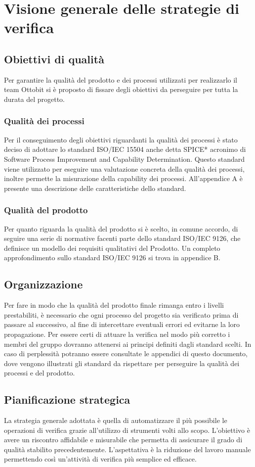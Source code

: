\section{Visione generale delle strategie di verifica}
\subsection{Obiettivi di qualità}
	Per garantire la qualità del prodotto e dei processi utilizzati per realizzarlo il team Ottobit si è proposto di fissare degli obiettivi da perseguire per tutta la durata del progetto.
	\subsubsection{Qualità dei processi}
	Per il conseguimento degli obiettivi riguardanti la qualità dei processi è stato deciso di adottare lo standard ISO/IEC 15504 anche detta SPICE* acronimo di Software Process Improvement and Capability Determination. Questo standard viene utilizzato per eseguire una valutazione concreta della qualità dei processi, inoltre permette la misurazione della capability dei processi. All'appendice A è presente una descrizione delle caratteristiche dello standard.
	\subsubsection{Qualità del prodotto}
		Per quanto riguarda la qualità del prodotto si è scelto, in comune accordo, di seguire una serie di normative facenti parte dello standard ISO/IEC 9126, che definisce un modello dei requisiti qualitativi del Prodotto. Un completo approfondimento sullo standard ISO/IEC 9126 si trova in appendice B.
\subsection{Organizzazione}
Per fare in modo che la qualità del prodotto finale rimanga entro i livelli prestabiliti, è necessario che ogni processo del progetto sia verificato prima di passare al successivo, al fine di intercettare eventuali errori ed evitarne la loro propagazione. Per essere certi di attuare la verifica nel modo più corretto i membri del gruppo dovranno attenersi ai principi definiti dagli standard scelti. In caso di perplessità potranno essere consultate le appendici di questo documento, dove vengono illustrati gli standard da rispettare per perseguire la qualità dei processi e del prodotto.

\subsection{Pianificazione strategica}
La strategia generale adottata è quella di automatizzare il più possibile le operazioni di verifica grazie all'utilizzo di strumenti volti allo scopo. L'obiettivo è avere un riscontro affidabile e misurabile che permetta di assicurare il grado di qualità stabilito precedentemente.  L'aspettativa è la riduzione del lavoro manuale permettendo così un'attività di verifica più semplice ed efficace.

